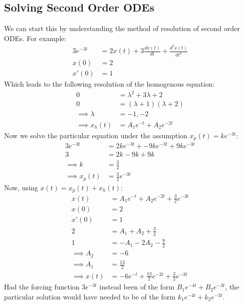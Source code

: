 \documentclass[nobib]{tufte-handout}
\begin{document}
\subsection{Solving Second Order ODEs}
We can start this by understanding the method of resolution of second order
ODEs. For example:
\begin{align*}
    3e^{-3t} & = 2x(t)+3\frac{dx(t)}{dt}+\frac{d^2x(t)}{dt^2} \\
    x(0)     & = 2                                            \\
    x'(0)    & = 1
\end{align*}
Which leads to the following resolution of the homogenous equation:
\begin{align*}
    0                & = \lambda^2+3\lambda+2   \\
    0                & = (\lambda+1)(\lambda+2) \\
    \implies \lambda & = -1, -2                 \\
    \implies x_h(t)  & = A_1e^{-t}+A_2e^{-2t}
\end{align*}
Now we solve the particular equation under the assumption $x_p(t)=ke^{-3t}$:
\begin{align*}
    3e^{-3t}        & = 2ke^{-3t}+-9ke^{-3t}+9ke^{-3t} \\
    3               & = 2k-9k+9k                       \\
    \implies k      & = \frac{3}{2}                    \\
    \implies x_p(t) & = \frac{3}{2}e^{-3t}
\end{align*}
Now, using $x(t)=x_p(t)+x_h(t)$:
\begin{align*}
    x(t)          & = A_1e^{-t}+A_2e^{-2t} + \frac{3}{2}e^{-3t}       \\
    x(0)          & = 2                                               \\
    x'(0)         & = 1                                               \\
    2             & = A_1+A_2+\frac{3}{2}                             \\
    1             & = -A_1-2A_2-\frac{9}{2}                           \\
    \implies A_2  & = -6                                              \\
    \implies A_1  & = \frac{13}{2}                                    \\
    \implies x(t) & = -6e^{-t}+\frac{13}{2}e^{-2t}+\frac{3}{2}e^{-3t}
\end{align*}
Had the forcing function $3e^{-3t}$ instead been of the form $B_1e^{-4t}+B_2e^{-3t}$, the particular solution would have needed to be of the form $k_1e^{-4t}+k_2e^{-3t}$.\\
\end{document}
